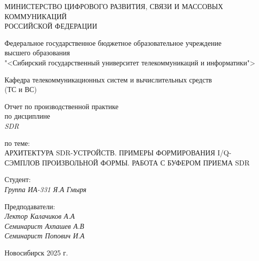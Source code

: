 \thispagestyle{empty}

\begin{center}
    МИНИСТЕРСТВО ЦИФРОВОГО РАЗВИТИЯ, СВЯЗИ И МАССОВЫХ КОММУНИКАЦИЙ \\ РОССИЙСКОЙ ФЕДЕРАЦИИ

    \vspace{20pt}

    Федеральное государственное бюджетное образовательное учреждение  \\  высшего образования \\
    "<Сибирский государственный университет телекоммуникаций и информатики"> \\

    \vspace{20pt}

    Кафедра телекоммуникационных систем и вычислительных средств \\  (ТС и ВС)
\end{center}

\vfill

\begin{center}
    Отчет по производственной практике \\  
    по дисциплине \\
    \textit{SDR}

    \vspace{20pt}
    по теме: \\
    \uppercase{Архитектура SDR-устройств. Примеры формирования I/Q-сэмплов произвольной формы. Работа с буфером приема SDR}
\end{center}

\vfill

    \noindent Студент: \\
    \textit{Группа ИА-331 \hfill Я.А Гмыря}

    \vspace{20pt}

    \noindent Предподаватели: \\
    \textit{Лектор \hfill Калачиков А.А} \\
    \textit{Семинарист \hfill Ахпашев А.В} \\
    \textit{Семинарист \hfill Попович И.А}

\vfill

\begin{center}
    Новосибирск 2025 г.
\end{center}